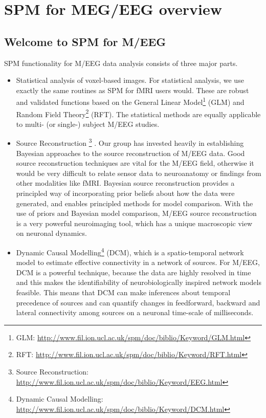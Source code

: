 \chapter{SPM for MEG/EEG overview \label{Chap:eeg:overview}}

\section{Welcome to SPM for M/EEG}

SPM functionality for M/EEG data analysis consists of three major parts. 

\begin{itemize}
 \item Statistical analysis of voxel-based images. For statistical analysis, we use exactly the same routines as SPM for fMRI users would. These are robust and validated functions based on the General Linear Model\footnote{GLM: \url{http://www.fil.ion.ucl.ac.uk/spm/doc/biblio/Keyword/GLM.html}} (GLM) and Random Field Theory\footnote{RFT: \url{http://www.fil.ion.ucl.ac.uk/spm/doc/biblio/Keyword/RFT.html}} (RFT). The statistical methods are equally applicable to multi- (or single-) subject M/EEG studies.

\item  Source Reconstruction \footnote{Source Reconstruction: \url{http://www.fil.ion.ucl.ac.uk/spm/doc/biblio/Keyword/EEG.html}} . Our group has invested heavily in establishing Bayesian approaches to the source reconstruction of M/EEG data. Good source reconstruction techniques are vital for the M/EEG field, otherwise it would be very difficult to relate sensor data to neuroanatomy or findings from other modalities like fMRI. Bayesian source reconstruction provides a principled way of incorporating prior beliefs about how the data were generated, and enables principled methods for model comparison. With the use of priors and Bayesian model comparison, M/EEG source reconstruction is a very powerful neuroimaging tool, which has a unique macroscopic view on neuronal dynamics.

\item Dynamic Causal Modelling\footnote{Dynamic Causal Modelling: \url{http://www.fil.ion.ucl.ac.uk/spm/doc/biblio/Keyword/DCM.html}} (DCM), which is a spatio-temporal network model to estimate effective connectivity in a network of sources. For M/EEG, DCM is a powerful technique, because the data are highly resolved in time and this makes the identifiability of neurobiologically inspired network models feasible. This means that DCM can make inferences about temporal precedence of sources and can quantify changes in feedforward, backward and lateral connectivity among sources on a neuronal time-scale of milliseconds. 
\end{itemize}

